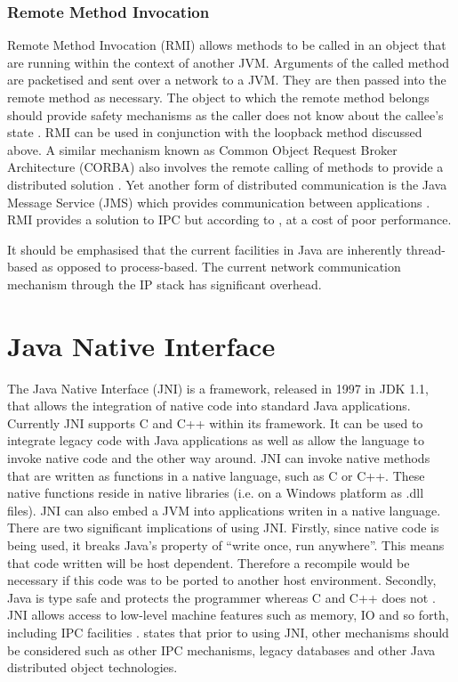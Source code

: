 \documentclass[12pt,a4paper,oneside]{article}
\begin{document}
  \subsubsection{Remote Method Invocation}
    Remote Method Invocation (RMI) allows methods to be called in an object that are running within the context of another JVM. Arguments of the called method are packetised and sent over a network to a JVM. They are then passed into the remote method as necessary. The object to which the remote method belongs should provide safety mechanisms as the caller does not know about the callee's state \citep{JavaConcurrencyInPractice}. RMI can be used in conjunction with the loopback method discussed above. A similar mechanism known as Common Object Request Broker Architecture (CORBA) also involves the remote calling of methods to provide a distributed solution \citep{WellsIPCMultiProc}. Yet another form of distributed communication is the Java Message Service (JMS) which provides communication between applications \citep{JavaAPI}. RMI provides a solution to IPC but according to \cite{taboada2013javaforHPC}, at a cost of poor performance.

  It should be emphasised that the current facilities in Java are inherently thread-based as opposed to process-based. The current network communication mechanism through the IP stack has significant overhead.

\section{Java Native Interface}
  The Java Native Interface (JNI) is a framework, released in 1997 in JDK 1.1, that allows the integration of native code into standard Java applications. Currently JNI supports C and C++ within its framework. It can be used to integrate legacy code with Java applications as well as allow the language to invoke native code and the other way around. JNI can invoke native methods that are written as functions in a native language, such as C or C++. These native functions reside in native libraries (i.e. on a Windows platform as .dll files). JNI can also embed a JVM into applications writen in a native language. There are two significant implications of using JNI. Firstly, since native code is being used, it breaks Java's property of “write once, run anywhere”. This means that code written will be host dependent. Therefore a recompile would be necessary if this code was to be ported to another host environment. Secondly, Java is type safe and protects the programmer whereas C and C++ does not \citep{LiangJNISpecification}. JNI allows access to low-level machine features such as memory, IO and so forth, including IPC facilities \citep{IBM2009}. \cite{LiangJNISpecification} states that prior to using JNI, other mechanisms should be considered such as other IPC mechanisms, legacy databases and other Java distributed object technologies.
\end{document}
